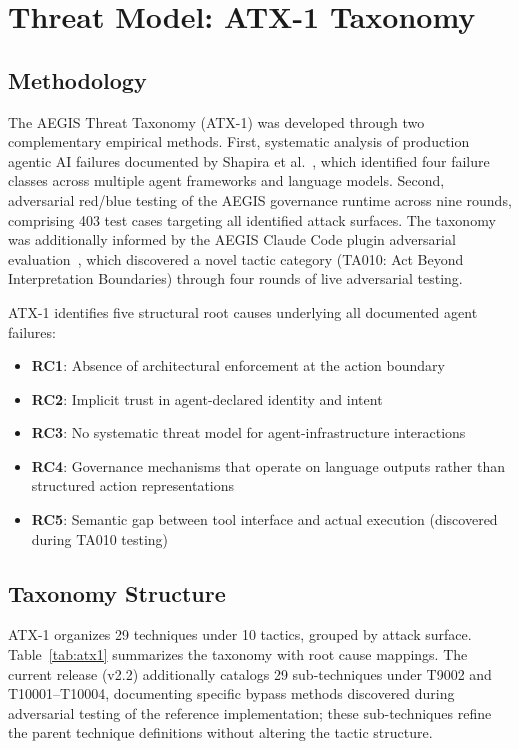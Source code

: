 \documentclass[journal]{IEEEtran}
\begin{document}
\section{Threat Model: ATX-1 Taxonomy}

\subsection{Methodology}

The AEGIS Threat Taxonomy (ATX-1) was developed through two complementary empirical methods. First, systematic analysis of production agentic AI failures documented by Shapira et al.~\cite{shapira2026}, which identified four failure classes across multiple agent frameworks and language models. Second, adversarial red/blue testing of the AEGIS governance runtime across nine rounds, comprising 403 test cases targeting all identified attack surfaces. The taxonomy was additionally informed by the AEGIS Claude Code plugin adversarial evaluation~\cite{tannenbaum2026_computer}, which discovered a novel tactic category (TA010: Act Beyond Interpretation Boundaries) through four rounds of live adversarial testing.

ATX-1 identifies five structural root causes underlying all documented agent failures:

\begin{itemize}
\item \textbf{RC1}: Absence of architectural enforcement at the action boundary
\item \textbf{RC2}: Implicit trust in agent-declared identity and intent
\item \textbf{RC3}: No systematic threat model for agent-infrastructure interactions
\item \textbf{RC4}: Governance mechanisms that operate on language outputs rather than structured action representations
\item \textbf{RC5}: Semantic gap between tool interface and actual execution (discovered during TA010 testing)
\end{itemize}

\subsection{Taxonomy Structure}

ATX-1 organizes 29 techniques under 10 tactics, grouped by attack surface. Table~\ref{tab:atx1} summarizes the taxonomy with root cause mappings. The current release (v2.2) additionally catalogs 29 sub-techniques under T9002 and T10001--T10004, documenting specific bypass methods discovered during adversarial testing of the reference implementation; these sub-techniques refine the parent technique definitions without altering the tactic structure.
\end{document}
